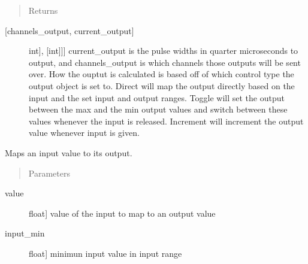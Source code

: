 \documentclass[letterpaper,10pt,english]{sphinxmanual}
\begin{document}
\begin{fulllineitems}
\begin{fulllineitems}
\begin{description}
\end{description}
\begin{quote}\begin{description}
\item[{Returns}] \leavevmode
\end{description}\end{quote}
\begin{description}
\item[{{[}channels\_output, current\_output{]}}] \leavevmode{[}{[}{[}int{]}, {[}int{]}{]}{]}
\sphinxAtStartPar
current\_output is the pulse widths in quarter microseconds to output, and channels\_output
is which channels those outputs will be sent over. How the ouptut is calculated is based
off of which control type the output object is set to. Direct will map the output directly
based on the input and the set input and output ranges. Toggle will set the output between
the max and the min output values and switch between these values whenever the input is
released. Increment will increment the output value whenever input is given.

\end{description}

\end{fulllineitems}


\begin{fulllineitems}
\label{\detokenize{generic:AnalogOutputObject.AnalogOutputObject.map_values}}
\sphinxAtStartPar
Maps an input value to its output.
\begin{quote}\begin{description}
\item[{Parameters}] \leavevmode
\end{description}\end{quote}
\begin{description}
\item[{value}] \leavevmode{[}float{]}
\sphinxAtStartPar
value of the input to map to an output value

\item[{input\_min}] \leavevmode{[}float{]}
\sphinxAtStartPar
minimun input value in input range


\end{description}
\end{fulllineitems}
\end{fulllineitems}
\end{document}
